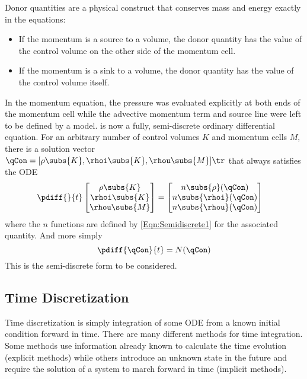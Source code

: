 Donor quantities are a physical construct that conserves mass and energy exactly in the equations:
\begin{itemize}
    \item{If the momentum is a source to a volume, the donor quantity has the value of the control volume on the other side of the momentum cell.}
    \item{If the momentum is a sink to a volume, the donor quantity has the value of the control volume itself.}
\end{itemize}
In the momentum equation, the pressure was evaluated explicitly at both ends of the momentum cell while the advective momentum term and source line were left to be defined by a model.
 is now a fully, semi-discrete ordinary differential equation.
For an arbitrary number of control volumes $K$ and momentum cells $M$, there is a solution vector $\qCon = [\rho\subs{K},\rhoi\subs{K},\rhou\subs{M}]\tr$ that always satisfies the ODE
\begin{align}
    \pdiff{}{t}
                \begin{bmatrix}
                    \rho\subs{K}    \\
                    \rhoi\subs{K}   \\
                    \rhou\subs{M}   \\
                \end{bmatrix}
                &=
                \begin{bmatrix}
                    n\subs{\rho} (\qCon) \\
                    n\subs{\rhoi}(\qCon) \\
                    n\subs{\rhou}(\qCon) 
                \end{bmatrix}
\end{align}
where the $n$ functions are defined by \cref{Eqn:Semidiscrete1} for the associated quantity.
And more simply
\begin{equation}
    \pdiff{\qCon}{t} =N(\qCon)
    \label{Eqn:SemidiscreteFinal}
\end{equation}
This is the semi-discrete form to be considered.


\subsection{Time Discretization}
Time discretization is simply integration of some ODE from a known initial condition forward in time.
There are many different methods for time integration.
Some methods use information already known to calculate the time evolution (explicit methods)
while others introduce an unknown state in the future and require the solution of a system to march forward in time (implicit methods).

